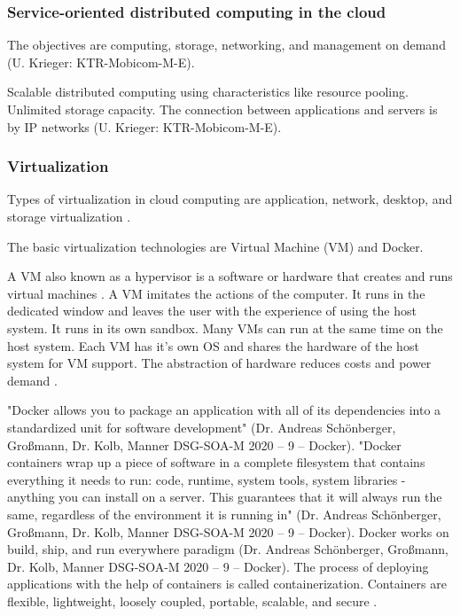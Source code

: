 
\subsubsection{Service-oriented distributed computing in the cloud}

The objectives are computing, storage, networking, and management on demand (U. Krieger: KTR-Mobicom-M-E). \par
Scalable distributed computing using characteristics like resource pooling. Unlimited storage capacity. The connection between applications and servers is by IP networks (U. Krieger: KTR-Mobicom-M-E). 


\subsubsection{Virtualization}

Types of virtualization in cloud computing are application, network, desktop, and storage virtualization \cite{nam}. \par
The basic virtualization technologies are Virtual Machine (VM) and Docker. \par
A VM also known as a hypervisor is a software or hardware that creates and runs virtual machines \cite{hypervisor}.
A VM imitates the actions of the computer. It runs in the dedicated window and leaves the user with the experience of using the host system. It runs in its own sandbox. Many VMs can run at the same time on the host system. Each VM has it's own OS and shares the hardware of the host system for VM support. The abstraction of hardware reduces costs and  power demand \cite{mic}. 

"Docker allows you to package an application with all of its dependencies into a standardized unit for software development" (Dr. Andreas Schönberger, Großmann, Dr. Kolb, Manner DSG-SOA-M 2020 – 9 – Docker). "Docker containers wrap up a piece of software in a complete filesystem that contains everything it needs to run: code, runtime, system tools, system libraries - anything you can install on a server. This guarantees that it will always run the same, regardless of the environment it is running in" (Dr. Andreas Schönberger, Großmann, Dr. Kolb, Manner DSG-SOA-M 2020 – 9 – Docker). Docker works on build, ship, and run everywhere paradigm (Dr. Andreas Schönberger, Großmann, Dr. Kolb, Manner DSG-SOA-M 2020 – 9 – Docker). The process of deploying applications with the help of containers is called containerization. Containers are flexible, lightweight, loosely coupled, portable, scalable, and secure \cite{doc}. \par

